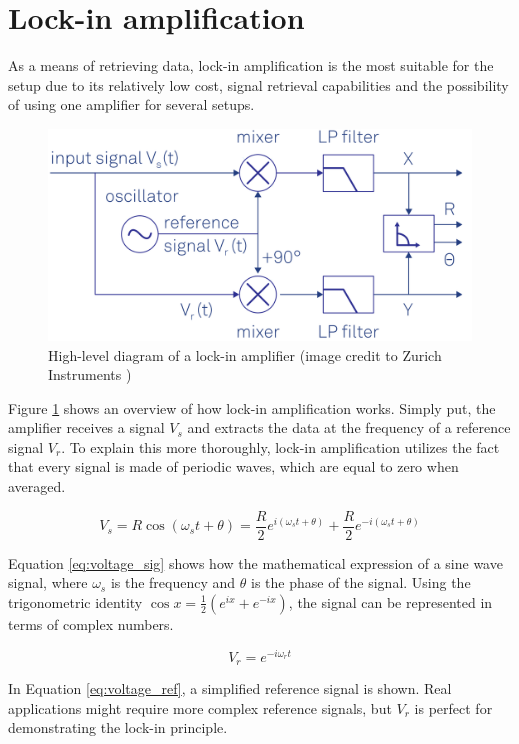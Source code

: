 \section{Lock-in amplification} \label{chap:lockin}
As a means of retrieving data, lock-in amplification is the most suitable for the setup due to its relatively low cost, signal retrieval capabilities and the possibility of using one amplifier for several setups. 

\begin{figure}[ht]
	\centering
	\includegraphics[width=0.7\linewidth]{img/lia_hl_schematic}
	\caption{High-level diagram of a lock-in amplifier (image credit to Zurich Instruments \cite{instruments2018principles})}
	\label{fig:liahlschematic}
\end{figure}

Figure \ref{fig:liahlschematic} shows an overview of how lock-in amplification works. Simply put, the amplifier receives a signal $V_s$ and extracts the data at the frequency of a reference signal $V_r$. To explain this more thoroughly, lock-in amplification utilizes the fact that every signal is made of periodic waves, which are equal to zero when averaged. 

\begin{equation}\label{eq:voltage_sig}
	V_s = R\cos{(\omega_st + \theta)} = \frac{R}{2}e^{i(\omega_st + \theta)} + \frac{R}{2}e^{-i(\omega_st + \theta)}
\end{equation}

Equation \ref{eq:voltage_sig} shows how the mathematical expression of a sine wave signal, where $\omega_s$ is the frequency and $\theta$ is the phase of the signal. Using the trigonometric identity $\cos{x} = \frac{1}{2}(e^{ix} + e^{-ix})$, the signal can be represented in terms of complex numbers.

\begin{equation}\label{eq:voltage_ref}
	V_r = e^{-i\omega_rt}
\end{equation}

In Equation \ref{eq:voltage_ref}, a simplified reference signal is shown. Real applications might require more complex reference signals, but $V_r$ is perfect for demonstrating the lock-in principle.

